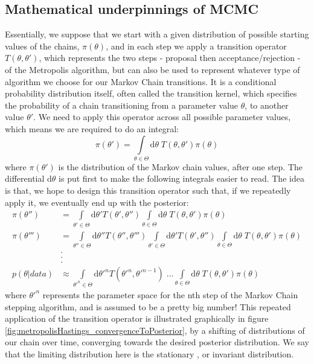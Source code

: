 \documentclass[11pt,fullpage]{book}
\begin{document}
\subsection{Mathematical underpinnings of MCMC}\label{sec:metropolisHastings_mathematicalMCMC}
Essentially, we suppose that we start with a given distribution of possible starting values of the chains, $\pi(\theta)$, and in each step we apply a transition operator $T(\theta,\theta')$, which represents the two steps - proposal then acceptance/rejection - of the Metropolis algorithm, but can also be used to represent whatever type of algorithm we choose for our Markov Chain transitions\cite{chib1995understanding}. It is a conditional probability distribution itself, often called the transition kernel, which specifies the probability of a chain transitioning from a parameter value $\theta$, to another value $\theta'$. We need to apply this operator across all possible parameter values, which means we are required to do an integral:
%
\begin{equation}
\pi(\theta') = \int\limits_{\theta\in\Theta} \mathrm{d}\theta \; T(\theta,\theta') \pi(\theta) 
\end{equation}
%
where $\pi(\theta')$ is the distribution of the Markov chain values, after one step. The differential $\mathrm{d}\theta$ is put first to make the following integrals easier to read. The idea is that, we hope to design this transition operator such that, if we repeatedly apply it, we eventually end up with the posterior:
%
\begin{equation}
\begin{align}
\pi(\theta'') &= \int\limits_{\theta'\in\Theta}\mathrm{d}\theta' T(\theta',\theta'') \int\limits_{\theta\in\Theta}\mathrm{d}\theta\; T(\theta,\theta') \pi(\theta)\\
\pi(\theta''') &=  \int\limits_{\theta''\in\Theta}\mathrm{d}\theta'' T(\theta'',\theta''') \int\limits_{\theta'\in\Theta}\mathrm{d}\theta' T(\theta',\theta'') \int\limits_{\theta\in\Theta}\mathrm{d}\theta \; T(\theta,\theta') \pi(\theta)\\ 
&.\\
&.\\
&.\\
p(\theta|data) &\approx  \int\limits_{\theta'^n\in\Theta}\mathrm{d}\theta'^n T(\theta'^n,\theta'^{n-1})\;... \int\limits_{\theta\in\Theta} \mathrm{d}\theta \; T(\theta,\theta') \pi(\theta)
\end{align}
\end{equation}
%
where $\theta'^n$ represents the parameter space for the nth step of the Markov Chain stepping algorithm, and is assumed to be a pretty big number! This repeated application of the transition operator is illustrated graphically in figure \ref{fig:metropolisHastings_convergenceToPosterior}, by a shifting of distributions of our chain over time, converging towards the desired posterior distribution. We say that the limiting distribution here is the stationary , or invariant  distribution.
\end{document}
